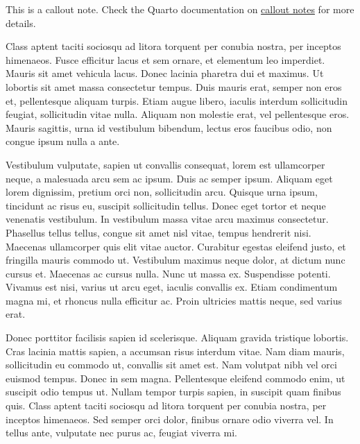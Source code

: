 \documentclass[
  12pt,
  a4paperpaper,
  a4paper]{scrreprt}
\begin{document}
\begin{tcolorbox}[enhanced jigsaw, bottomtitle=1mm, coltitle=black, opacitybacktitle=0.6, breakable, titlerule=0mm, toptitle=1mm, colframe=quarto-callout-note-color-frame, rightrule=.15mm, bottomrule=.15mm, colback=white, arc=.35mm, title=\textcolor{quarto-callout-note-color}{\faInfo}\hspace{0.5em}{Hinweis}, toprule=.15mm, colbacktitle=quarto-callout-note-color!10!white, left=2mm, leftrule=.75mm, opacityback=0]

This is a callout note. Check the Quarto documentation on
\href{https://quarto.org/docs/authoring/callouts.html}{callout notes}
for more details.

\end{tcolorbox}

Class aptent taciti sociosqu ad litora torquent per conubia nostra, per
inceptos himenaeos. Fusce efficitur lacus et sem ornare, et elementum
leo imperdiet. Mauris sit amet vehicula lacus. Donec lacinia pharetra
dui et maximus. Ut lobortis sit amet massa consectetur tempus. Duis
mauris erat, semper non eros et, pellentesque aliquam turpis. Etiam
augue libero, iaculis interdum sollicitudin feugiat, sollicitudin vitae
nulla. Aliquam non molestie erat, vel pellentesque eros. Mauris
sagittis, urna id vestibulum bibendum, lectus eros faucibus odio, non
congue ipsum nulla a ante.

Vestibulum vulputate, sapien ut convallis consequat, lorem est
ullamcorper neque, a malesuada arcu sem ac ipsum. Duis ac semper ipsum.
Aliquam eget lorem dignissim, pretium orci non, sollicitudin arcu.
Quisque urna ipsum, tincidunt ac risus eu, suscipit sollicitudin tellus.
Donec eget tortor et neque venenatis vestibulum. In vestibulum massa
vitae arcu maximus consectetur. Phasellus tellus tellus, congue sit amet
nisl vitae, tempus hendrerit nisi. Maecenas ullamcorper quis elit vitae
auctor. Curabitur egestas eleifend justo, et fringilla mauris commodo
ut. Vestibulum maximus neque dolor, at dictum nunc cursus et. Maecenas
ac cursus nulla. Nunc ut massa ex. Suspendisse potenti. Vivamus est
nisi, varius ut arcu eget, iaculis convallis ex. Etiam condimentum magna
mi, et rhoncus nulla efficitur ac. Proin ultricies mattis neque, sed
varius erat.

Donec porttitor facilisis sapien id scelerisque. Aliquam gravida
tristique lobortis. Cras lacinia mattis sapien, a accumsan risus
interdum vitae. Nam diam mauris, sollicitudin eu commodo ut, convallis
sit amet est. Nam volutpat nibh vel orci euismod tempus. Donec in sem
magna. Pellentesque eleifend commodo enim, ut suscipit odio tempus ut.
Nullam tempor turpis sapien, in suscipit quam finibus quis. Class aptent
taciti sociosqu ad litora torquent per conubia nostra, per inceptos
himenaeos. Sed semper orci dolor, finibus ornare odio viverra vel. In
tellus ante, vulputate nec purus ac, feugiat viverra mi.
\end{document}
